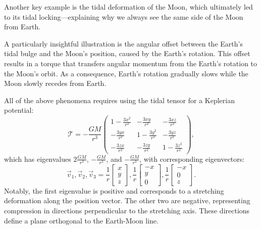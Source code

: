             Another key example is the tidal deformation of the Moon, which ultimately led to its tidal locking—explaining why we always see the same side of the Moon from Earth.

            A particularly insightful illustration is the angular offset between the Earth's tidal bulge and the Moon's position, caused by the Earth's rotation. This offset results in a torque that transfers angular momentum from the Earth's rotation to the Moon's orbit. As a consequence, Earth's rotation gradually slows while the Moon slowly recedes from Earth. 
            
            All of the above phenomena requires using the tidal tensor for a Keplerian potential:
            \begin{equation}
                \mathcal{T}= -\frac{GM}{r^3}\left(\begin{matrix}
                    1-\frac{3x^2}{r^2} & -\frac{3xy}{r^2} & -\frac{3xz}{r^2} \\
                    -\frac{3yx}{r^2} & 1-\frac{3y^2}{r^2} & -\frac{3yz}{r^2} \\
                    -\frac{3zx}{r^2} & -\frac{3zy}{r^2} & 1-\frac{3z^2}{r^2}
                \end{matrix}\right),
            \end{equation}
            which has eigenvalues $2\frac{GM}{r^3}$, $-\frac{GM}{r^3}$, and $-\frac{GM}{r^3}$, with corresponding eigenvectors:
            \begin{equation}
                \vec{v}_1,\vec{v}_2,\vec{v}_3 = \dfrac{1}{r}\begin{bmatrix} x \\ y \\ z \end{bmatrix}, \dfrac{1}{r}\begin{bmatrix} -x \\ y \\ 0 \end{bmatrix}, \dfrac{1}{r}\begin{bmatrix} -x \\ 0 \\ z \end{bmatrix}.
            \end{equation}
            Notably, the first eigenvalue is positive and corresponds to a stretching deformation along the position vector. The other two are negative, representing compression in directions perpendicular to the stretching axis. These directions define a plane orthogonal to the Earth-Moon line. 
            
